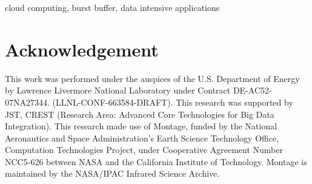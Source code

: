 \documentclass[10pt, conference, compsocconf]{IEEEtran}
\begin{document}
\begin{IEEEkeywords}
	cloud computing, burst buffer, data intensive applications
\end{IEEEkeywords}

\IEEEpeerreviewmaketitle





%



%








\section*{Acknowledgement}
This work was performed under the auspices of the U.S. Department of Energy by
Lawrence Livermore National Laboratory under Contract DE-AC52-07NA27344.
(LLNL-CONF-663584-DRAFT).
This research was supported by JST, CREST (Research Area: Advanced Core Technologies for
Big Data Integration).
This research made use of Montage, funded by the National Aeronautics and Space Administration's
Earth Science Technology Office, Computation Technologies Project, under
Cooperative Agreement Number NCC5-626 between NASA and the California Institute
of Technology. Montage is maintained by the NASA/IPAC Infrared Science Archive.

\end{document}
